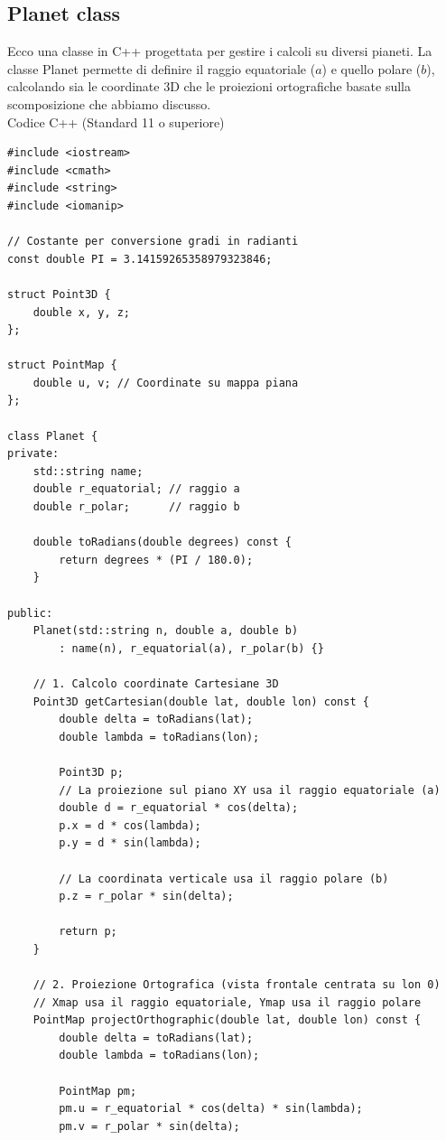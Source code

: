 \documentclass[a4paper,14pt]{article}
\begin{document}
\subsection{Planet class}
Ecco una classe in C++ progettata per gestire i calcoli su diversi pianeti. La classe Planet permette di definire il raggio equatoriale (\(a\)) e quello polare (\(b\)), calcolando sia le coordinate 3D che le proiezioni ortografiche basate sulla scomposizione che abbiamo discusso.\\
Codice C++ (Standard 11 o superiore)\\
{
\scriptsize
\begin{verbatim}
#include <iostream>
#include <cmath>
#include <string>
#include <iomanip>

// Costante per conversione gradi in radianti
const double PI = 3.14159265358979323846;

struct Point3D {
    double x, y, z;
};

struct PointMap {
    double u, v; // Coordinate su mappa piana
};

class Planet {
private:
    std::string name;
    double r_equatorial; // raggio a
    double r_polar;      // raggio b

    double toRadians(double degrees) const {
        return degrees * (PI / 180.0);
    }

public:
    Planet(std::string n, double a, double b)
        : name(n), r_equatorial(a), r_polar(b) {}

    // 1. Calcolo coordinate Cartesiane 3D
    Point3D getCartesian(double lat, double lon) const {
        double delta = toRadians(lat);
        double lambda = toRadians(lon);

        Point3D p;
        // La proiezione sul piano XY usa il raggio equatoriale (a)
        double d = r_equatorial * cos(delta);
        p.x = d * cos(lambda);
        p.y = d * sin(lambda);

        // La coordinata verticale usa il raggio polare (b)
        p.z = r_polar * sin(delta);

        return p;
    }

    // 2. Proiezione Ortografica (vista frontale centrata su lon 0)
    // Xmap usa il raggio equatoriale, Ymap usa il raggio polare
    PointMap projectOrthographic(double lat, double lon) const {
        double delta = toRadians(lat);
        double lambda = toRadians(lon);

        PointMap pm;
        pm.u = r_equatorial * cos(delta) * sin(lambda);
        pm.v = r_polar * sin(delta);


\end{verbatim}}
\end{document}
